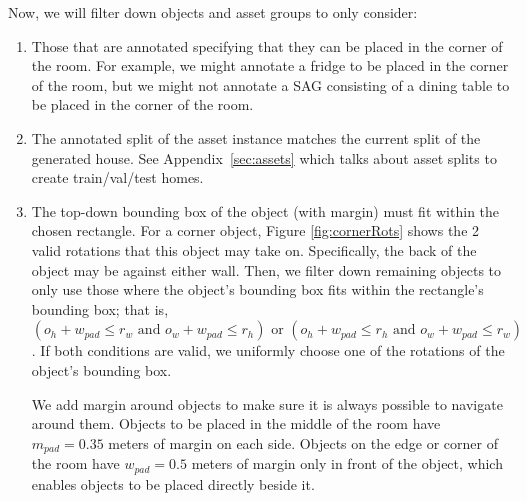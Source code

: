 Now, we will filter down objects and asset groups to only consider:
\begin{enumerate}[leftmargin=0.25in]
    \item Those that are annotated specifying that they can be placed in the corner of the room. For example, we might annotate a fridge to be placed in the corner of the room, but we might not annotate a SAG consisting of a dining table to be placed in the corner of the room.
    \item The annotated split of the asset instance matches the current split of the generated house. See Appendix~\ref{sec:assets} which talks about asset splits to create train/val/test homes.
    \item The top-down bounding box of the object (with margin) must fit within the chosen rectangle. For a corner object, Figure \ref{fig:cornerRots} shows the 2 valid rotations that this object may take on. Specifically, the back of the object may be against either wall. Then, we filter down remaining objects to only use those where the object's bounding box fits within the rectangle's bounding box; that is, $(o_h + w_{\textit{pad}}\leq r_w \text{ and } o_w + w_{\textit{pad}} \leq r_h) \text{ or } (o_h + w_{\textit{pad}} \leq r_h \text{ and } o_w + w_{\textit{pad}} \leq r_w)$. If both conditions are valid, we uniformly choose one of the rotations of the object's bounding box.

    We add margin around objects to make sure it is always possible to navigate around them. Objects to be placed in the middle of the room have $m_{\textit{pad}}=0.35$ meters of margin on each side. Objects on the edge or corner of the room have $w_{\textit{pad}} = 0.5$ meters of margin only in front of the object, which enables objects to be placed directly beside it. 
\end{enumerate}

